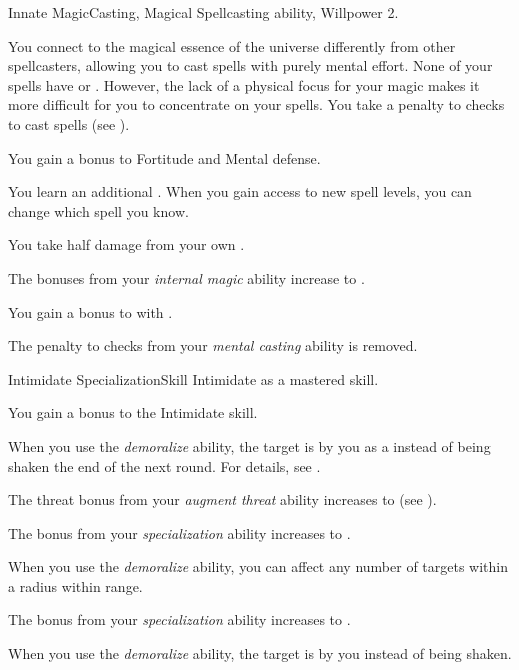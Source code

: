     \begin{feat}{Innate Magic}{Casting, Magical}
        \featpre Spellcasting ability, Willpower 2.

         You connect to the magical essence of the universe differently from other spellcasters, allowing you to cast spells with purely mental effort.
        None of your spells have  or .
        However, the lack of a physical focus for your magic makes it more difficult for you to concentrate on your spells.
        You take a  penalty to  checks to cast spells (see ).

         You gain a  bonus to Fortitude and Mental defense.

         You learn an additional .
        When you gain access to new spell levels, you can change which spell you know.

         You take half damage from your own .

         The bonuses from your \textit{internal magic} ability increase to .

         You gain a  bonus to  with .

         The penalty to  checks from your \textit{mental casting} ability is removed.
    \end{feat}

    \begin{feat}{Intimidate Specialization}{Skill}
        \featpre Intimidate as a mastered skill.

         You gain a  bonus to the Intimidate skill.

         When you use the \textit{demoralize} ability, the target is  by you as a  instead of being shaken the end of the next round.
        For details, see .

         The threat bonus from your \textit{augment threat} ability increases to  (see ).

         The bonus from your \textit{specialization} ability increases to .

         When you use the \textit{demoralize} ability, you can affect any number of targets within a \areamed radius within \rngmed range.

         The bonus from your \textit{specialization} ability increases to .

         When you use the \textit{demoralize} ability, the target is \panicked by you instead of being shaken.
    \end{feat}

